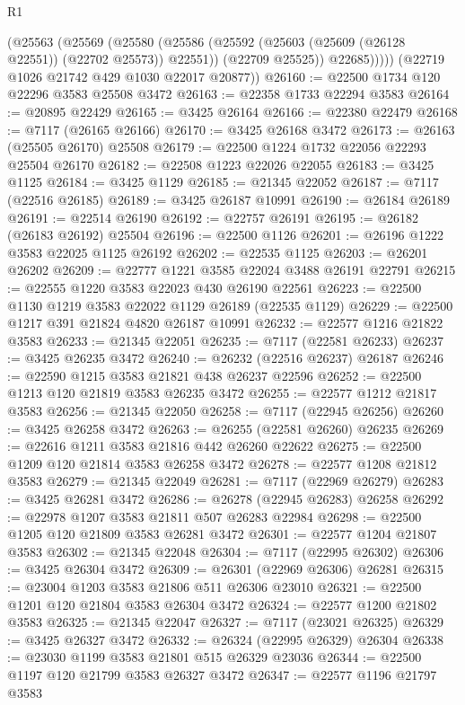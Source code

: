 \begin{lexlean}{R1}
\begin{coremodule}
            (@25563
              (@25569
                (@25580
                  (@25586 (@25592 (@25603 (@25609 (@26128 @22551)) (@22702 @25573)) @22551))
                  (@22709 @25525))
                @22685)))))
      (@22719 @1026 @21742 @429 @1030 @22017 @20877))
@26160 := @22500 @1734 @120 @22296 @3583 @25508 @3472
@26163 := @22358 @1733 @22294 @3583
@26164 := @20895 @22429
@26165 := @3425 @26164
@26166 := @22380 @22479
@26168 := @7117 (@26165 @26166)
@26170 := @3425 @26168 @3472
@26173 := @26163 (@25505 @26170) @25508
@26179 := @22500 @1224 @1732 @22056 @22293 @25504 @26170
@26182 := @22508 @1223 @22026 @22055
@26183 := @3425 @1125
@26184 := @3425 @1129
@26185 := @21345 @22052
@26187 := @7117 (@22516 @26185)
@26189 := @3425 @26187 @10991
@26190 := @26184 @26189
@26191 := @22514 @26190
@26192 := @22757 @26191
@26195 := @26182 (@26183 @26192) @25504
@26196 := @22500 @1126
@26201 := @26196 @1222 @3583 @22025 @1125 @26192
@26202 := @22535 @1125
@26203 := @26201 @26202
@26209 := @22777 @1221 @3585 @22024 @3488 @26191 @22791
@26215 := @22555 @1220 @3583 @22023 @430 @26190 @22561
@26223 := @22500 @1130 @1219 @3583 @22022 @1129 @26189 (@22535 @1129)
@26229 := @22500 @1217 @391 @21824 @4820 @26187 @10991
@26232 := @22577 @1216 @21822 @3583
@26233 := @21345 @22051
@26235 := @7117 (@22581 @26233)
@26237 := @3425 @26235 @3472
@26240 := @26232 (@22516 @26237) @26187
@26246 := @22590 @1215 @3583 @21821 @438 @26237 @22596
@26252 := @22500 @1213 @120 @21819 @3583 @26235 @3472
@26255 := @22577 @1212 @21817 @3583
@26256 := @21345 @22050
@26258 := @7117 (@22945 @26256)
@26260 := @3425 @26258 @3472
@26263 := @26255 (@22581 @26260) @26235
@26269 := @22616 @1211 @3583 @21816 @442 @26260 @22622
@26275 := @22500 @1209 @120 @21814 @3583 @26258 @3472
@26278 := @22577 @1208 @21812 @3583
@26279 := @21345 @22049
@26281 := @7117 (@22969 @26279)
@26283 := @3425 @26281 @3472
@26286 := @26278 (@22945 @26283) @26258
@26292 := @22978 @1207 @3583 @21811 @507 @26283 @22984
@26298 := @22500 @1205 @120 @21809 @3583 @26281 @3472
@26301 := @22577 @1204 @21807 @3583
@26302 := @21345 @22048
@26304 := @7117 (@22995 @26302)
@26306 := @3425 @26304 @3472
@26309 := @26301 (@22969 @26306) @26281
@26315 := @23004 @1203 @3583 @21806 @511 @26306 @23010
@26321 := @22500 @1201 @120 @21804 @3583 @26304 @3472
@26324 := @22577 @1200 @21802 @3583
@26325 := @21345 @22047
@26327 := @7117 (@23021 @26325)
@26329 := @3425 @26327 @3472
@26332 := @26324 (@22995 @26329) @26304
@26338 := @23030 @1199 @3583 @21801 @515 @26329 @23036
@26344 := @22500 @1197 @120 @21799 @3583 @26327 @3472
@26347 := @22577 @1196 @21797 @3583

\end{coremodule}
\end{lexlean}
